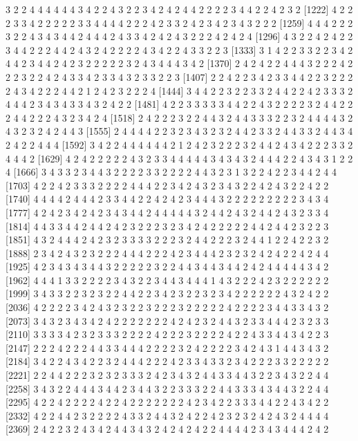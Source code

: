\begin{Schunk}
\begin{Soutput}
[1185] 3 2 2 4 4 4 4 4 4 3 4 2 2 4 3 2 2 3 4 2 4 2 4 4 2 2 2 2 3 4 4 2 2 4 2 3 2
[1222] 4 2 2 2 3 3 4 2 2 2 2 2 3 3 4 4 4 4 2 2 2 4 2 3 3 2 4 2 3 4 2 3 4 3 2 2 2
[1259] 4 4 4 2 2 2 3 2 2 4 3 4 3 4 4 2 4 4 4 2 4 3 3 4 2 4 2 4 3 2 2 2 4 2 4 2 4
[1296] 4 3 2 2 4 2 4 2 2 3 4 4 2 2 2 4 4 2 4 3 2 4 2 2 2 2 4 3 4 2 2 4 3 3 2 2 3
[1333] 3 1 4 2 2 3 3 2 2 3 4 2 4 4 2 3 4 4 2 4 2 3 2 2 2 2 2 3 2 4 3 4 4 4 3 4 2
[1370] 2 4 2 4 2 2 4 4 4 3 2 2 2 4 2 2 2 3 2 2 4 2 4 3 3 4 2 3 3 4 3 2 3 3 2 2 3
[1407] 2 2 4 2 2 3 4 2 3 3 4 4 2 2 3 2 2 2 2 4 3 4 2 2 2 4 4 2 1 2 4 2 3 2 2 2 4
[1444] 3 4 4 2 2 3 2 2 3 3 2 4 4 2 2 4 2 3 3 3 2 4 4 4 2 3 4 3 4 3 3 4 3 2 4 2 2
[1481] 4 2 2 3 3 3 3 3 4 4 2 2 4 3 2 2 2 2 3 2 4 4 2 2 2 4 4 2 2 2 4 3 2 3 4 2 4
[1518] 2 4 2 2 2 3 2 2 4 4 3 2 4 4 3 3 3 2 2 3 2 4 4 4 4 3 2 4 3 2 3 2 4 2 4 4 3
[1555] 2 4 4 4 4 2 2 3 2 3 4 3 2 3 2 4 4 2 3 3 2 4 4 3 3 2 4 4 3 4 2 4 2 2 4 4 4
[1592] 3 4 2 2 4 4 4 4 4 4 2 1 2 4 2 3 2 2 2 3 2 4 4 2 4 3 4 2 2 2 3 3 2 4 4 4 2
[1629] 4 2 4 2 2 2 2 2 4 3 2 3 3 4 4 4 4 4 3 4 3 4 3 2 4 4 4 2 2 4 3 4 3 1 2 2 4
[1666] 3 4 3 3 2 3 4 4 3 2 2 2 2 3 3 2 2 2 2 4 4 3 2 3 1 3 2 2 4 2 2 3 4 4 2 4 4
[1703] 4 2 2 4 2 3 3 3 2 2 2 2 4 4 4 2 2 3 4 2 4 3 2 3 4 3 2 2 4 2 4 3 2 2 4 2 2
[1740] 4 4 4 4 2 4 4 4 2 3 3 4 4 2 2 4 2 4 2 3 4 4 4 3 2 2 2 2 2 2 2 2 2 3 4 3 4
[1777] 4 2 4 2 3 4 2 4 2 3 4 3 4 4 2 4 4 4 4 4 3 2 4 4 2 4 3 2 4 4 2 4 3 2 3 3 4
[1814] 4 4 3 3 4 4 2 4 4 2 4 2 3 2 2 2 3 2 3 4 2 4 2 2 2 2 2 4 4 2 4 4 2 3 2 2 3
[1851] 4 3 2 4 4 4 2 4 2 3 2 3 3 3 3 2 2 2 3 2 4 4 2 2 2 3 2 4 4 1 2 2 4 2 2 3 2
[1888] 2 3 4 2 4 3 2 3 2 2 2 4 4 4 2 2 2 4 2 3 4 4 4 2 3 2 3 2 4 2 4 2 2 4 2 4 4
[1925] 4 2 3 4 3 4 3 4 4 3 2 2 2 2 2 3 2 2 4 4 3 4 4 3 4 4 2 4 2 4 4 4 4 4 3 4 2
[1962] 4 4 4 1 3 3 2 2 2 2 3 4 3 2 2 3 4 4 3 4 4 4 1 4 3 2 2 2 4 2 3 2 2 2 2 2 2
[1999] 3 4 3 3 2 2 3 2 3 2 2 4 4 2 2 3 4 2 3 2 2 3 2 3 4 2 2 2 2 2 2 4 3 2 4 2 2
[2036] 4 2 2 2 2 3 4 2 4 3 2 3 2 2 3 2 2 2 3 2 2 2 2 2 4 2 2 2 2 3 4 4 3 3 4 3 2
[2073] 3 4 3 2 3 4 3 4 2 4 2 2 2 2 2 2 2 4 2 4 2 3 2 4 4 3 2 3 3 4 4 4 2 3 2 3 3
[2110] 3 3 3 3 4 2 3 2 3 3 3 2 2 2 2 4 2 2 2 3 2 2 2 2 4 2 2 4 3 3 4 4 3 4 2 2 3
[2147] 2 2 2 4 2 2 2 4 4 3 3 4 4 4 2 2 2 2 3 2 4 2 2 2 2 3 4 2 4 3 1 4 4 3 4 3 2
[2184] 3 4 2 2 4 3 4 2 2 3 2 4 4 4 2 2 2 4 2 3 3 4 3 3 2 3 4 2 2 2 3 3 2 2 2 2 2
[2221] 2 2 4 4 2 2 2 3 2 3 2 3 3 3 2 4 2 3 4 3 2 4 4 3 3 4 4 3 2 2 3 4 3 2 2 4 4
[2258] 3 4 3 2 2 4 4 4 3 4 4 2 3 4 4 3 2 2 3 3 3 2 2 4 4 3 3 3 4 3 4 4 3 2 2 4 4
[2295] 4 2 2 4 2 2 2 2 4 2 2 4 2 2 2 2 2 2 2 4 2 3 4 2 2 3 3 3 4 4 2 2 4 3 4 2 2
[2332] 4 2 2 4 4 2 3 2 2 2 2 4 3 3 2 4 4 3 2 4 2 2 4 2 3 2 3 2 4 2 4 3 2 4 4 4 4
[2369] 2 4 2 2 3 2 4 3 4 2 4 4 3 4 3 2 4 2 4 2 4 2 2 4 4 4 4 2 3 4 3 4 4 4 2 4 2

\end{Soutput}
\end{Schunk}
